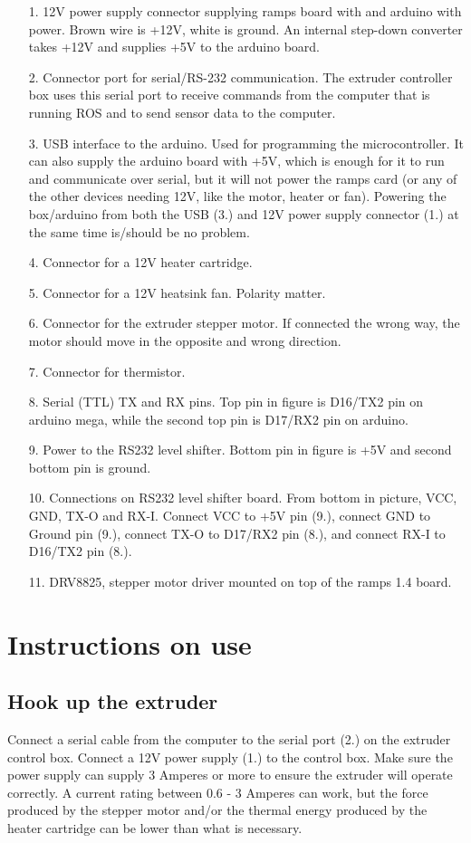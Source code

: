 \documentclass[10pt]{article}
\begin{document}
\begin{enumerate}
\item[1.] 12V power supply connector supplying ramps board with and arduino with power. Brown wire is +12V, white is ground. An internal step-down converter takes +12V and supplies +5V to the arduino board.
\item[2.] Connector port for serial/RS-232 communication. The extruder controller box uses this serial port to receive commands from the computer that is running ROS and to send sensor data to the computer.
\item[3.] USB interface to the arduino. Used for programming the microcontroller. It can also supply the arduino board with +5V, which is enough for it to run and communicate over serial, but it will not power the ramps card (or any of the other devices needing 12V, like the motor, heater or fan). Powering the box/arduino from both the USB (3.) and 12V power supply connector (1.) at the same time is/should be no problem.
\item[4.] Connector for a 12V heater cartridge.
\item[5.] Connector for a 12V heatsink fan. Polarity matter.
\item[6.] Connector for the extruder stepper motor. If connected the wrong way, the motor should move in the opposite and wrong direction.
\item[7.] Connector for thermistor.
\item[8.] Serial (TTL) TX and RX pins. Top pin in figure is D16/TX2 pin on arduino mega, while the second top pin is D17/RX2 pin on arduino.
\item[9.] Power to the RS232 level shifter. Bottom pin in figure is +5V and second bottom pin is ground.
\item[10.] Connections on RS232 level shifter board. From bottom in picture, VCC, GND, TX-O and RX-I. Connect VCC to +5V pin (9.), connect GND to Ground pin (9.), connect TX-O to D17/RX2 pin (8.), and connect RX-I to D16/TX2 pin (8.).
\item[11.] DRV8825, stepper motor driver mounted on top of the ramps 1.4 board.
\end{enumerate}

\newpage
\section{Instructions on use}
\subsection{Hook up the extruder}
Connect a serial cable from the computer to the serial port (2.) on the extruder control box.
Connect a 12V power supply (1.) to the control box. Make sure the power supply can supply 3 Amperes or more to ensure the extruder will operate correctly. A current rating between 0.6 - 3 Amperes can work, but the force produced by the stepper motor and/or the thermal energy produced by the heater cartridge can be lower than what is necessary.
\end{document}
